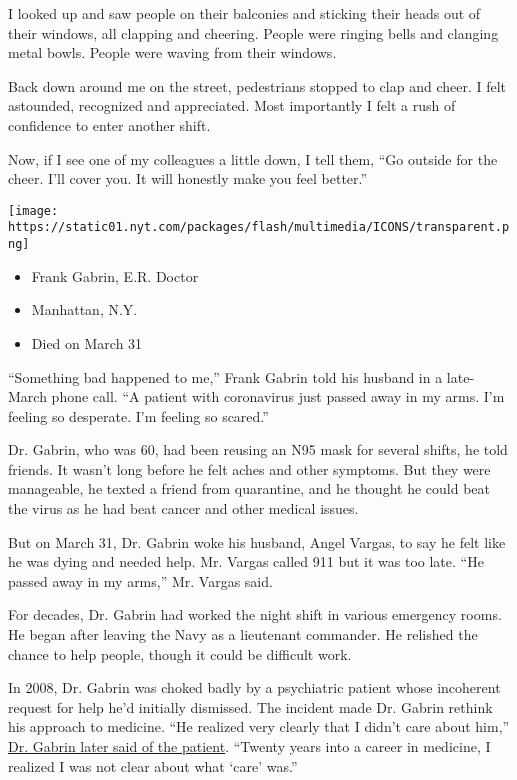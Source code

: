 I looked up and saw people on their balconies and sticking their heads
out of their windows, all clapping and cheering. People were ringing
bells and clanging metal bowls. People were waving from their windows.

Back down around me on the street, pedestrians stopped to clap and
cheer. I felt astounded, recognized and appreciated. Most importantly I
felt a rush of confidence to enter another shift.

Now, if I see one of my colleagues a little down, I tell them, ``Go
outside for the cheer. I'll cover you. It will honestly make you feel
better.''

\texttt{[image: https://static01.nyt.com/packages/flash/multimedia/ICONS/transparent.png]}

\begin{itemize}
\tightlist
\item
  Frank Gabrin, E.R. Doctor
\item
  Manhattan, N.Y.
\item
  Died on March 31
\end{itemize}

``Something bad happened to me,'' Frank Gabrin told his husband in a
late-March phone call. ``A patient with coronavirus just passed away in
my arms. I'm feeling so desperate. I'm feeling so scared.''

Dr. Gabrin, who was 60, had been reusing an N95 mask for several shifts,
he told friends. It wasn't long before he felt aches and other symptoms.
But they were manageable, he texted a friend from quarantine, and he
thought he could beat the virus as he had beat cancer and other medical
issues.

But on March 31, Dr. Gabrin woke his husband, Angel Vargas, to say he
felt like he was dying and needed help. Mr. Vargas called 911 but it was
too late. ``He passed away in my arms,'' Mr. Vargas said.

For decades, Dr. Gabrin had worked the night shift in various emergency
rooms. He began after leaving the Navy as a lieutenant commander. He
relished the chance to help people, though it could be difficult work.

In 2008, Dr. Gabrin was choked badly by a psychiatric patient whose
incoherent request for help he'd initially dismissed. The incident made
Dr. Gabrin rethink his approach to medicine. ``He realized very clearly
that I didn't care about him,''
\href{https://www.youtube.com/watch?v=6IxPRKdFvxk}{Dr. Gabrin later said
of the patient}. ``Twenty years into a career in medicine, I realized I
was not clear about what `care' was.''

